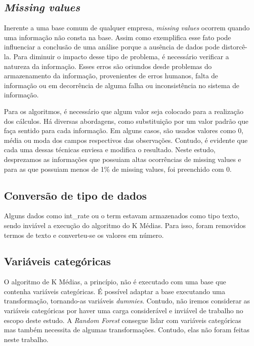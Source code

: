 \subsection{\emph{Missing values}}
Inerente a uma base comum de qualquer empresa, \emph{missing values} ocorrem quando uma informação não consta na base. Assim como exemplifica  esse fato pode influenciar a conclusão de uma análise porque a ausência de dados pode distorcê-la. Para diminuir o impacto desse tipo de problema, é necessário verificar a natureza da informação. Esses erros são oriundos desde problemas do armazenamento da informação, provenientes de erros humanos, falta de informação ou em decorrência de alguma falha ou inconsistência no sistema de informação.

Para os algoritmos, é necessário que algum valor seja colocado para a realização dos cálculos. Há diversas abordagens, como substituição por um valor padrão que faça sentido para cada informação. Em alguns casos, são usados valores como 0, média ou moda dos campos respectivos das observações. Contudo, é evidente que cada uma dessas técnicas enviesa e modifica o resultado. Neste estudo, desprezamos as informações que possuiam altas ocorrências de missing values e para as que possuiam menos de 1\% de missing values, foi preenchido com 0. 

\subsection{Conversão de tipo de dados}
Alguns dados como int\_rate ou o term estavam armazenados como tipo texto, sendo inviável a execução do algoritmo do K Médias. Para isso, foram removidos termos de texto e converteu-se os valores em número.


\subsection{Variáveis categóricas}
O algoritmo de K Médias, a princípio, não é executado com uma base que contenha variáveis categóricas. É possível adaptar a base executando uma transformação, tornando-as variáveis \emph{dummies}. Contudo, não iremos considerar as variáveis categóricas por haver uma carga considerável e inviável de trabalho no escopo deste estudo. A \emph{Random Forest} consegue lidar com variáveis categóricas mas também necessita de algumas transformações. Contudo, elas não foram feitas neste trabalho.



